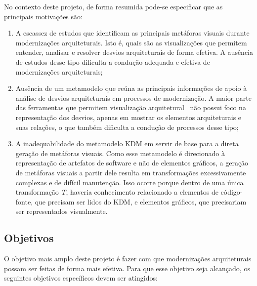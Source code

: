 \documentclass[12pt]{article}
\begin{document}
No contexto deste projeto, de forma resumida pode-se especificar que as principais motivações são:

\begin{enumerate}

\item A escassez de estudos que identificam as principais metáforas visuais durante modernizações arquiteturais. Isto é, quais são as visualizações que permitem entender, analisar e resolver desvios arquiteturais de forma efetiva. A ausência de estudos desse tipo dificulta a condução adequada e efetiva de modernizações arquiteturais;

\item Ausência de um metamodelo que reúna as principais informações de apoio à análise de desvios arquiteturais em processos de modernização. A maior parte das ferramentas que permitem visualização arquitetural~\cite{Maffort_2013, Knodel_2007, ArchJava_2202} não possui foco na representação dos desvios, apenas em mostrar os elementos arquiteturais e suas relações, o que também dificulta a condução de processos desse tipo;

\item A inadequabilidade do metamodelo KDM em servir de base para a direta geração de metáforas visuais. Como esse metamodelo é direcionado à representação de artefatos de software e não de elementos gráficos, a geração de metáforas visuais a partir dele resulta em transformações excessivamente complexas e de difícil manutenção. Isso ocorre porque dentro de uma única transformação \textit{T}, haveria conhecimento relacionado a elementos de código-fonte, que precisam ser lidos do KDM, e elementos gráficos, que precisariam ser representados visualmente.
\end{enumerate}


\subsection{Objetivos}

O objetivo mais amplo deste projeto é fazer com que modernizações arquiteturais possam ser feitas de forma mais efetiva. Para que esse objetivo seja alcançado, os seguintes objetivos específicos devem ser atingidos:
\end{document}
